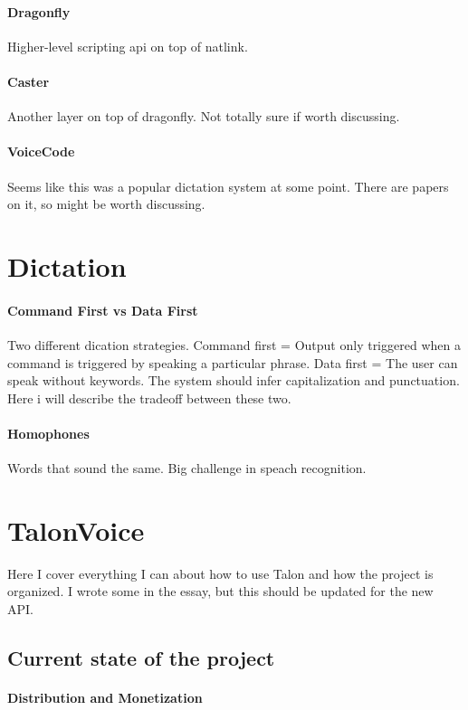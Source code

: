 \documentclass[a4paper,english]{ifimaster}
\begin{document}
\paragraph{Dragonfly}
Higher-level scripting api on top of natlink.

\paragraph{Caster}
Another layer on top of dragonfly. Not totally sure if worth discussing.

\paragraph{VoiceCode}
Seems like this was a popular dictation system at some point. There are papers on it, so might be worth discussing.

\section{Dictation}
\paragraph{Command First vs Data First}
Two different dication strategies.
Command first = Output only triggered when a command is triggered by speaking a particular phrase.
Data first = The user can speak without keywords. The system should infer capitalization and punctuation.
Here i will describe the tradeoff between these two.
\paragraph{Homophones}
Words that sound the same. Big challenge in speach recognition.


\section{TalonVoice}
Here I cover everything I can about how to use Talon and how the project is organized.
I wrote some in the essay, but this should be updated for the new API.

\subsection{Current state of the project}
\paragraph{Distribution and Monetization}
\end{document}
